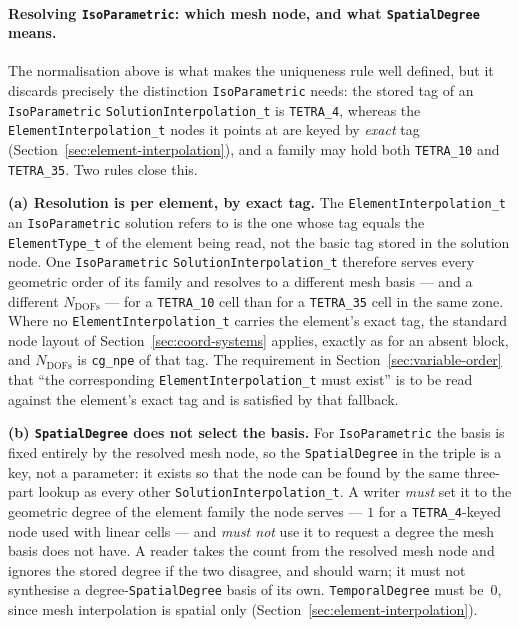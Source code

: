 \documentclass[11pt,letterpaper]{article}
\newif\ifvfourdraft
\newenvironment{v4block}{\ifvfourdraft\color{v4violet}\fi\ignorespaces}{\par}
\newcommand{\vfourmark}{\ifvfourdraft\textcolor{v4violet}{\textbf{[v4]}}\ \fi}
\begin{document}
\begin{v4block}
\paragraph{\vfourmark Resolving \texttt{IsoParametric}: which mesh node, and what
\texttt{SpatialDegree} means.}
\label{sec:isoparam-resolution}
The normalisation above is what makes the uniqueness rule well defined, but it
discards precisely the distinction \texttt{IsoParametric} needs: the stored tag of
an \texttt{IsoParametric} \texttt{SolutionInterpolation\_t} is \texttt{TETRA\_4},
whereas the \texttt{ElementInterpolation\_t} nodes it points at are keyed by
\emph{exact} tag (Section~\ref{sec:element-interpolation}), and a family may hold
both \texttt{TETRA\_10} and \texttt{TETRA\_35}.  Two rules close this.

\smallskip\noindent\textbf{(a) Resolution is per element, by exact tag.}  The
\texttt{ElementInterpolation\_t} an \texttt{IsoParametric} solution refers to is
the one whose tag equals the \texttt{ElementType\_t} of the element being read,
not the basic tag stored in the solution node.  One \texttt{IsoParametric}
\texttt{SolutionInterpolation\_t} therefore serves every geometric order of its
family and resolves to a different mesh basis --- and a different
$N_\mathrm{DOFs}$ --- for a \texttt{TETRA\_10} cell than for a
\texttt{TETRA\_35} cell in the same zone.  Where no
\texttt{ElementInterpolation\_t} carries the element's exact tag, the standard
node layout of Section~\ref{sec:coord-systems} applies, exactly as for an absent
block, and $N_\mathrm{DOFs}$ is \texttt{cg\_npe} of that tag.  The requirement in
Section~\ref{sec:variable-order} that ``the corresponding
\texttt{ElementInterpolation\_t} must exist'' is to be read against the element's
exact tag and is satisfied by that fallback.

\smallskip\noindent\textbf{(b) \texttt{SpatialDegree} does not select the basis.}
For \texttt{IsoParametric} the basis is fixed entirely by the resolved mesh node,
so the \texttt{SpatialDegree} in the triple is a key, not a parameter: it exists
so that the node can be found by the same three-part lookup as every other
\texttt{SolutionInterpolation\_t}.  A writer \emph{must} set it to the geometric
degree of the element family the node serves --- $1$ for a
\texttt{TETRA\_4}-keyed node used with linear cells --- and \emph{must not} use it
to request a degree the mesh basis does not have.  A reader takes the count from
the resolved mesh node and ignores the stored degree if the two disagree, and
should warn; it must not synthesise a degree-\texttt{SpatialDegree} basis of its
own.  \texttt{TemporalDegree} must be~$0$, since mesh interpolation is spatial
only (Section~\ref{sec:element-interpolation}).
\end{v4block}
\end{document}

